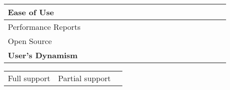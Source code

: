 \begin{sidewaystable}
\begin{tabular}{|l|c|c|c|c|c||c|c|c||c|c|c|c|c|c|c|c|c|c|}
    \hline\scriptsize{Ease of Use}& & & & & &{\color{gray}\faStar{}} &{\color{gray}\faStar{}} & {\color{gray}\faStarHalf*{}} & & & & & & & &\\
    
    \hline\scriptsize{Performance Reports} &  
    {\color{gray}\faStarHalf*{}}& 
    {\color{gray}\faStar{}}&&
    {\color{gray}\faStar{}}&
    {\color{gray}\faStar{}}&
    {\color{gray}\faStar{}}&
    {\color{gray}\faStar{}}&
    {\color{gray}\faStar{}}&&&
    {\color{gray}\faStarHalf*{}}&
    {\color{gray}\faStarHalf*{}}&
    {\color{gray}\faStarHalf*{}}&
    {\color{gray}\faStarHalf*{}}&
    {\color{gray}\faStarHalf*{}}&
    {\color{gray}\faStarHalf*{}}\\
    
    \hline\scriptsize{Open Source}& 
    {\color{gray}\faStar{}}&&
    {\color{gray}\faStar{}}& 
    {\color{gray}\faStarHalf*{}}&
    {\color{gray}\faStar{}}&&&
    {\color{gray}\faStarHalf*{}}&
    {\color{gray}\faStar{}}&
    {\color{gray}\faStar{}}&
    {\color{gray}\faStar{}}& 
    {\color{gray}\faStar{}}&
    {\color{gray}\faStar{}}&
    {\color{gray}\faStar{}}&
    {\color{gray}\faStar{}}& 
    {\color{gray}\faStar{}}\\
    
    \hline
    \hline\rowcolor{dark-gray} {\color{black}\scriptsize{\textbf{User's Dynamism}}}& &
    & & & {\color{black}\faStarHalf*{}}
    &{\color{black}\faStarHalf*{}} & {\color{black}\faStarHalf*{}} &
    {\color{black}\faStarHalf*{}} & & & & & & & &\\
    
    \hline
    
    \end{tabular}
    \vspace{0.3cm}
    
    \begin{tabular}{ccc}
    \faStar{}  Full support & \faStarHalf*{} Partial support
    \end{tabular}
    
    \caption{Web workload generators and grade in which main features are
    fulfilled}\label{tbl:phd-raul}
    
    \end{sidewaystable}


